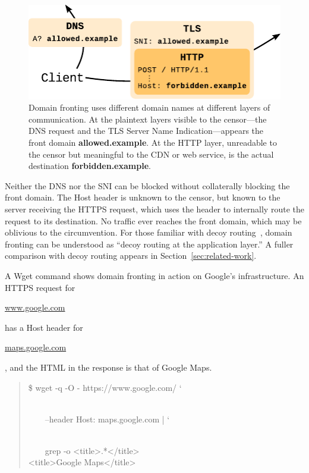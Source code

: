 \documentclass[conference]{IEEEtran}
\def\urll#1{\begin{NoHyper}\url{#1}\end{NoHyper}}
\begin{document}
\begin{figure}[ht]
\centering
\includegraphics[width=\linewidth]{fronting}
\caption{
Domain fronting uses different domain names at different layers of communication.
At the plaintext layers visible to the censor---the DNS request and the
TLS Server Name Indication---appears
the front domain \mbox{\textbf{allowed.example}}.
At the HTTP layer, unreadable to the censor but meaningful to the CDN or web service,
is the actual destination \mbox{\textbf{forbidden.example}}.
}
\label{fig:fronting}
\end{figure}

Neither the DNS nor the SNI can be blocked without
collaterally blocking the front domain.
The Host header is unknown to the censor,
but known to the server receiving the HTTPS request,
which uses the header to internally route the request to its destination.
No traffic ever reaches the front domain,
which may be oblivious to the circumvention.
For those familiar with decoy routing~\cite{decoyrouting,telex,cirripede,tapdance},
domain fronting can be understood as
``decoy routing at the application layer.''
A fuller comparison with decoy routing appears in Section~\ref{sec:related-work}.

A Wget command shows domain fronting in action
on Google's infrastructure.
An HTTPS request for \urll{www.google.com} has a Host header for
\urll{maps.google.com}, and the HTML in the response is that of Google Maps.

\noindent
\begin{quote}
%
\$ wget -q -O - https://www.google.com/ \char`\\\\
\strut~~~~--header \textquotesingle{}Host: maps.google.com\textquotesingle{} | \char`\\\\
\strut~~~~grep -o \textquotesingle{}<title>.*</title>\textquotesingle{}\\
<title>Google Maps</title>
\end{quote}
\end{document}
